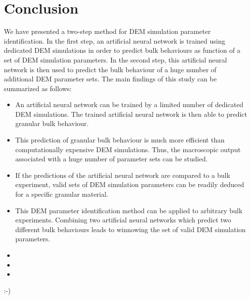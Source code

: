 
\part{Conclusion}
\label{par:conclusion}

We have presented a two-step method for \acs{DEM} simulation parameter
identification. 
In the first step, an artificial neural network is 
trained using dedicated \acs{DEM} simulations in order to predict bulk 
behaviours as function of a set of \acs{DEM} simulation parameters. 
In the second step, this artificial neural network is then used 
to predict the bulk behaviour of a huge number of additional \acs{DEM} parameter
sets.
The main findings of this study can be summarized as follows:
\begin{itemize}
  \item{An artificial neural network can be trained by a limited number of
  dedicated \acs{DEM} simulations.
  		The trained artificial neural network is then able to predict
  		granular bulk behaviour.}
  \item{This prediction of granular bulk behaviour is much more efficient
  		than computationally expensive \acs{DEM} simulations.
  		Thus, the macroscopic output associated with a huge number of parameter sets
  		can be studied.}
  \item{If the predictions of the artificial neural network are compared to a bulk experiment, 
  		valid sets of \acs{DEM} simulation parameters can be readily deduced for a
  		specific granular material.}
  \item{This \acs{DEM} parameter identification method can be applied to
  arbitrary bulk experiments.
  		Combining two artificial neural networks which predict two different bulk
  		behaviours leads to winnowing the set of valid \acs{DEM} simulation parameters.}
   \item{}
   \item{}
   \item{}
\end{itemize}
:-)
